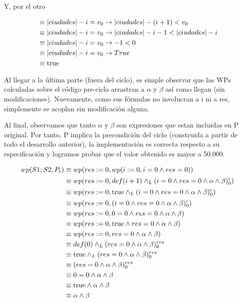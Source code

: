 \documentclass[10pt,a4paper]{article}
\begin{document}
\begin {enumerate}
    Y, por el otro 

    \begin{align*}
        &\equiv |ciudades| - i = v_{0} \to |ciudades| - (i + 1) < v_{0} \\
        &\equiv |ciudades| - i = v_{0} \to |ciudades| - i - 1 < |ciudades| - i \\
        &\equiv |ciudades| - i = v_{0} \to - 1 < 0 \\
        &\equiv |ciudades| - i = v_{0} \to True \\
        &\equiv \mathrm{true}   
    \end{align*}



    Al llegar a la última parte (fuera del ciclo), es simple observar que las WPs calculadas sobre el código pre-ciclo arrastran a $\alpha$ y $\beta$ así como llegan
    (sin modificaciones). Nuevamente, como sus fórmulas no involucran a i ni a res, simplemente se acoplan sin modificación alguna.

    Al final, observamos que tanto $\alpha$ y $\beta$ son expresiones que estan incluidas en P original. Por tanto, P implica la precondición
    del ciclo (construida a partir de todo el desarrollo anterior), la implementación es correcta respecto a su especificación y logramos 
    probar que el valor obtenido es mayor a 50.000.

    \begin{align*}
        wp(S1;S2, P_{c}) &\equiv wp(res := 0, wp(i := 0, i = 0 \land res = 0 )) \\
        &\equiv wp(res := 0, def(i + 1) \land _L (i = 0 \land res = 0 \land \alpha \land \beta)_{0}^{i}) \\
        &\equiv wp(res := 0, \mathrm{true} \land _L (i = 0 \land res = 0 \land \alpha \land \beta)_{0}^{i}) \\
        &\equiv wp(res := 0, (i = 0 \land res = 0 \land \alpha \land \beta)_{0}^{i}) \\
        &\equiv wp(res := 0, 0 = 0 \land res = 0 \land \alpha \land \beta) \\
        &\equiv wp(res := 0, \mathrm{true} \land res = 0 \land \alpha \land \beta) \\
        &\equiv wp(res := 0, res = 0 \land \alpha \land \beta) \\
        &\equiv def (0) \land _L (res = 0  \land \alpha \land \beta)_{0}^{res} \\
        &\equiv \mathrm{true} \land _L (res = 0 \land \alpha \land \beta)_{0}^{res} \\
        &\equiv (res = 0  \land \alpha \land \beta)_{0}^{res} \\
        &\equiv 0 = 0  \land \alpha \land \beta \\
        &\equiv \mathrm{true}  \land \alpha \land \beta\\
        &\equiv \alpha \land \beta
    \end{align*}


\end{enumerate}
\end{document}
